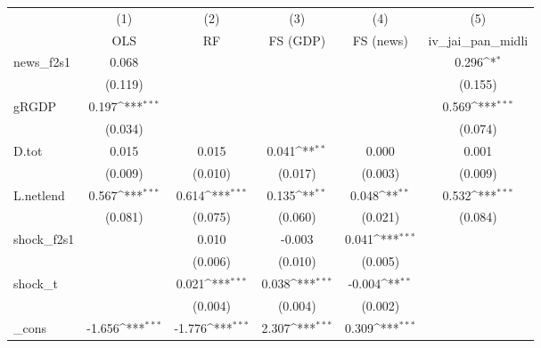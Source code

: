 {
\def\sym#1{\ifmmode^{#1}\else\(^{#1}\)\fi}
\begin{tabular}{l*{5}{c}}
\toprule
            &\multicolumn{1}{c}{(1)}&\multicolumn{1}{c}{(2)}&\multicolumn{1}{c}{(3)}&\multicolumn{1}{c}{(4)}&\multicolumn{1}{c}{(5)}\\
            &\multicolumn{1}{c}{OLS}&\multicolumn{1}{c}{RF}&\multicolumn{1}{c}{FS (GDP)}&\multicolumn{1}{c}{FS (news)}&\multicolumn{1}{c}{iv\_jai\_pan\_midli}\\
\midrule
news\_f2s1   &       0.068         &                     &                     &                     &       0.296\sym{*}  \\
            &     (0.119)         &                     &                     &                     &     (0.155)         \\
\addlinespace
gRGDP       &       0.197\sym{***}&                     &                     &                     &       0.569\sym{***}\\
            &     (0.034)         &                     &                     &                     &     (0.074)         \\
\addlinespace
D.tot       &       0.015         &       0.015         &       0.041\sym{**} &       0.000         &       0.001         \\
            &     (0.009)         &     (0.010)         &     (0.017)         &     (0.003)         &     (0.009)         \\
\addlinespace
L.netlend   &       0.567\sym{***}&       0.614\sym{***}&       0.135\sym{**} &       0.048\sym{**} &       0.532\sym{***}\\
            &     (0.081)         &     (0.075)         &     (0.060)         &     (0.021)         &     (0.084)         \\
\addlinespace
shock\_f2s1  &                     &       0.010         &      -0.003         &       0.041\sym{***}&                     \\
            &                     &     (0.006)         &     (0.010)         &     (0.005)         &                     \\
\addlinespace
shock\_t     &                     &       0.021\sym{***}&       0.038\sym{***}&      -0.004\sym{**} &                     \\
            &                     &     (0.004)         &     (0.004)         &     (0.002)         &                     \\
\addlinespace
\_cons      &      -1.656\sym{***}&      -1.776\sym{***}&       2.307\sym{***}&       0.309\sym{***}&                     \\

\end{tabular}}
